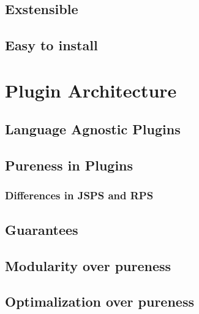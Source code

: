 \documentclass[runningheads]{llncs}
\begin{document}
\subsection{Exstensible}
\subsection{Easy to install}

\section{Plugin Architecture}
\subsection{Language Agnostic Plugins}
\subsection{Pureness in Plugins}
\subsubsection{Differences in JSPS and RPS}
\subsection{Guarantees}
\subsection{Modularity over pureness}
\subsection{Optimalization over pureness}
\end{document}

